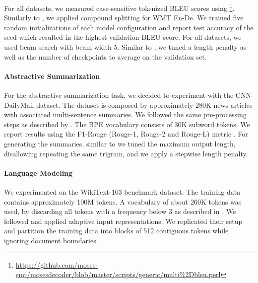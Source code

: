 \documentclass{article}
\def\wiki{WikiText-103}
\def\cnndm{CNN-DailyMail}
\def\ende{WMT En-De}
\begin{document}
For all datasets, we measured case-sensitive tokenized BLEU scores using \footnote{\url{https://github.com/moses-smt/mosesdecoder/blob/master/scripts/generic/multi\%2Dbleu.perl}}. Similarly to \citet{vaswani2017attention}, we applied compound splitting for \ende{}. We trained five random initializations of each model configuration and report test accuracy of the seed which resulted in the highest validation BLEU score. For all datasets, we used beam search with beam width 5. Similar to \citet{wu2019pay}, we tuned a length penalty as well as the number of checkpoints to average on the validation set.

\paragraph{Abstractive Summarization} For the abstractive summarization task, we decided to experiment with the \cnndm{} \cite{10.5555/2969239.2969428,nallapati-etal-2016-abstractive} dataset. The dataset is composed by approximately 280K news articles with associated multi-sentence summaries. We followed the same pre-processing steps as described by \citet{wu2019pay}. The BPE vocabulary consists of 30K subword tokens. We report results using the F1-Rouge (Rouge-1, Rouge-2 and Rouge-L) metric \cite{lin-2004-rouge}. For generating the summaries, similar to \citet{wu2019pay} we tuned the maximum output length, disallowing repeating the same trigram, and we apply a stepwise length penalty.

\paragraph{Language Modeling} We experimented on the \wiki{} \cite{DBLP:journals/corr/MerityXBS16} benchmark dataset. The training data contains approximately 100M tokens. A vocabulary of about 260K tokens was used, by discarding all tokens with a frequency below 3 as described in \citet{DBLP:journals/corr/MerityXBS16}. We followed \citet{DBLP:journals/corr/abs-1809-10853} and applied adaptive input representations. We replicated their setup and partition the training data into blocks of 512 contiguous tokens while ignoring document boundaries.
\end{document}
